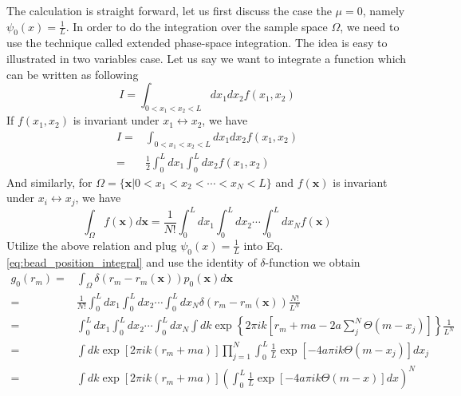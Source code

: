 \documentclass[12pt,a4paper]{article}
\begin{document}
The calculation is straight forward, let us first discuss the case the $\mu=0$,
namely $\psi_0(x) = \frac{1}{L}$. In order to do the integration over the sample space
$\Omega$, we need to use the technique called extended phase-space
integration.\cite{} The idea is easy to illustrated in two variables case. Let us
say we want to integrate a function which can be written as following
\begin{equation}
    \label{eq:integration_illustration_1}
    I = \int_{0 < x_1 < x_2 < L} d x_1 d x_2 f(x_1, x_2)
\end{equation}
If $f(x_1, x_2)$ is invariant under $x_1 \leftrightarrow x_2$, we have 
\begin{equation}
    \label{eq:integration_illustration_2}
    \begin{aligned}
        I = & \int_{0 < x_1 < x_2 < L} d x_1 d x_2 f(x_1, x_2) \\
        = &\frac{1}{2}\int_{0}^L d x_1 \int_{0}^L d x_2 f(x_1, x_2)
    \end{aligned}
\end{equation}
And similarly, for $\Omega = \{\mathbf{x} | 0 < x_1 < x_2 < \cdots < x_N <
L\}$ and $f(\mathbf{x})$ is invariant under $x_i\leftrightarrow x_j$, we have
\begin{equation}
    \label{eq:integration_illustration_3}
    \int_{\Omega} f(\mathbf{x}) d\mathbf{x} = \frac{1}{N!}\int_0^L dx_1 \int_0^L
    dx_2 \cdots \int_0^L dx_N f(\mathbf{x})
\end{equation}
Utilize the above relation and plug $\psi_0(x) = \frac{1}{L}$ into Eq.
\eqref{eq:bead_position_integral} and use the identity of $\delta$-function we
obtain
\begin{align*}
    g_0(r_m) = & \int_{\Omega} \delta(r_m - r_m(\mathbf{x})) p_0(\mathbf{x})
    d\mathbf{x} \\
    = & \frac{1}{N!}\int_0^Ldx_1\int_0^Ldx_2\cdots\int_0^Ldx_N \delta(r_m -
    r_m(\mathbf{x})) \frac{N!}{L^N} \\
    = & \int_0^Ldx_1\int_0^Ldx_2\cdots\int_0^Ldx_N \int d k \exp\left\{2\pi i k
        \left[r_m + ma - 2a\sum_j^N\Theta(m-x_j)\right]\right\} \frac{1}{L^N} \\
    = & \int dk \exp\left[2\pi i k (r_m + ma)\right] \prod_{j=1}^N\int_0^L
    \frac{1}{L}\exp\left[-4 a\pi i k\Theta(m-x_j)\right] d x_j \\
    = & \int dk \exp\left[2\pi i k (r_m + ma)\right] \left(\int_0^L
        \frac{1}{L}\exp\left[-4a\pi i k\Theta(m-x)\right] d x\right)^N
\end{align*}
\end{document}
